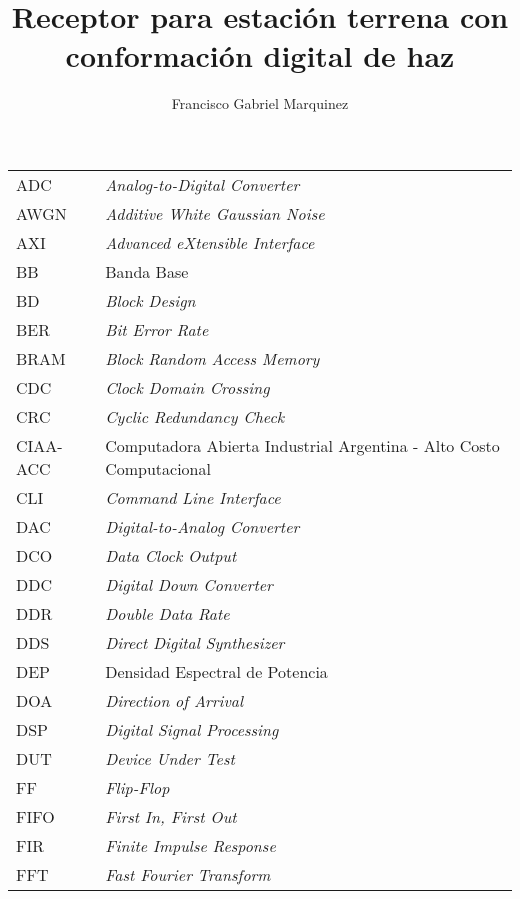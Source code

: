 \documentclass[screen, pagebackref,oneside]{ibtesis}
\title{Receptor para estación terrena con conformación digital de haz}
\author{Francisco Gabriel Marquinez}
\begin{document}
\begin{preliminary}


    \begin{abreviaturas}
        \begin{longtable}{ll}
            ADC &   \textit{Analog-to-Digital Converter} \\
            AWGN &  \textit{Additive White Gaussian Noise} \\
            AXI &   \textit{Advanced eXtensible Interface}  \\
            BB  &   Banda Base  \\
            BD  &   \textit{Block Design} \\
            BER &   \textit{Bit Error Rate} \\
            BRAM &  \textit{Block Random Access Memory} \\
            CDC &   \textit{Clock Domain Crossing}  \\
            CRC &   \textit{Cyclic Redundancy Check}    \\
            CIAA-ACC & Computadora Abierta Industrial Argentina - Alto Costo Computacional  \\
            CLI &   \textit{Command Line Interface} \\  
            DAC &   \textit{Digital-to-Analog Converter}    \\
            DCO &   \textit{Data Clock Output}  \\
            DDC &   \textit{Digital Down Converter} \\
            DDR &   \textit{Double Data Rate}   \\
            DDS &   \textit{Direct Digital Synthesizer} \\
            DEP &   Densidad Espectral de Potencia \\   
            DOA &   \textit{Direction of Arrival}   \\
            DSP &   \textit{Digital Signal Processing} \\
            DUT &   \textit{Device Under Test}  \\
            FF  &   \textit{Flip-Flop}  \\
            FIFO &  \textit{First In, First Out}    \\
            FIR &   \textit{Finite Impulse Response}    \\
            FFT &   \textit{Fast Fourier Transform} \\

\end{longtable}
\end{abreviaturas}
\end{preliminary}
\end{document}
